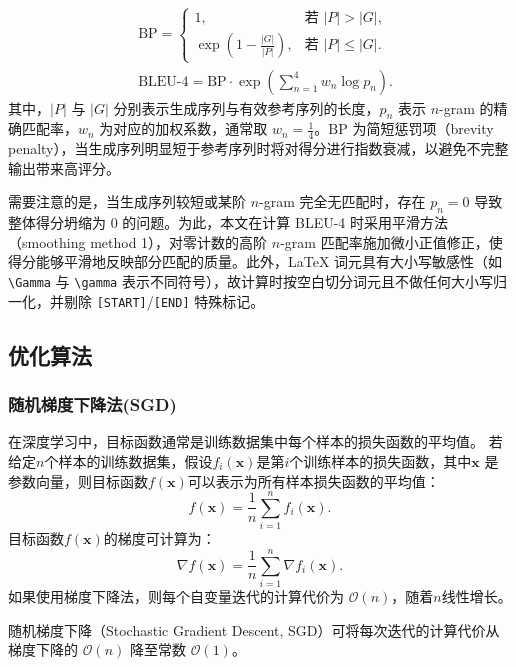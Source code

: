 \begin{enumerate}[label={（\arabic*）}, leftmargin=2em, labelsep=0.5em, itemsep=0pt]
\begin{align}
&\text{BP} =
\begin{cases}
1, & \text{若 } |P| > |G|, \\
\exp\left(1 - \frac{|G|}{|P|}\right), & \text{若 } |P| \leq |G|.
\end{cases} \\
&\text{BLEU-4} = \text{BP} \cdot \exp\left( \sum_{n=1}^{4} w_n \log p_n \right).
\end{align}
其中，$|P|$ 与 $|G|$ 分别表示生成序列与有效参考序列的长度，$p_n$ 表示 $n$-gram 的精确匹配率，$w_n$ 为对应的加权系数，通常取 $w_n = \frac{1}{4}$。$\text{BP}$ 为简短惩罚项（brevity penalty），当生成序列明显短于参考序列时将对得分进行指数衰减，以避免不完整输出带来高评分。

需要注意的是，当生成序列较短或某阶 $n$-gram 完全无匹配时，存在 $p_n = 0$ 导致整体得分坍缩为 $0$ 的问题。为此，本文在计算 BLEU-4 时采用平滑方法（smoothing method 1），对零计数的高阶 $n$-gram 匹配率施加微小正值修正，使得分能够平滑地反映部分匹配的质量。此外，LaTeX 词元具有大小写敏感性（如 \texttt{\textbackslash Gamma} 与 \texttt{\textbackslash gamma} 表示不同符号），故计算时按空白切分词元且不做任何大小写归一化，并剔除 \texttt{[START]}/\texttt{[END]} 特殊标记。
\end{enumerate}
\subsection{优化算法}
\subsubsection{随机梯度下降法(SGD)}
在深度学习中，目标函数通常是训练数据集中每个样本的损失函数的平均值。
若给定$n$个样本的训练数据集，假设$f_i(\boldsymbol{x})$是第$i$个训练样本的损失函数，其中$\boldsymbol{x}$
是参数向量，则目标函数$f(\boldsymbol{x})$可以表示为所有样本损失函数的平均值：
\begin{equation}
    f(\boldsymbol{x})=\frac{1}{n} \sum_{i=1}^n f_i(\boldsymbol{x}).
\end{equation}
目标函数$f(\boldsymbol{x})$的梯度可计算为：
\begin{equation}
    \nabla f(\boldsymbol{x})=\frac{1}{n} \sum_{i=1}^n \nabla f_i(\boldsymbol{x}).
\end{equation}
如果使用梯度下降法，则每个自变量迭代的计算代价为 $\mathcal{O}(n)$，随着$n$线性增长。

随机梯度下降（Stochastic Gradient Descent, SGD）可将每次迭代的计算代价从梯度下降的 $\mathcal{O}(n)$ 降至常数 $\mathcal{O}(1)$。

